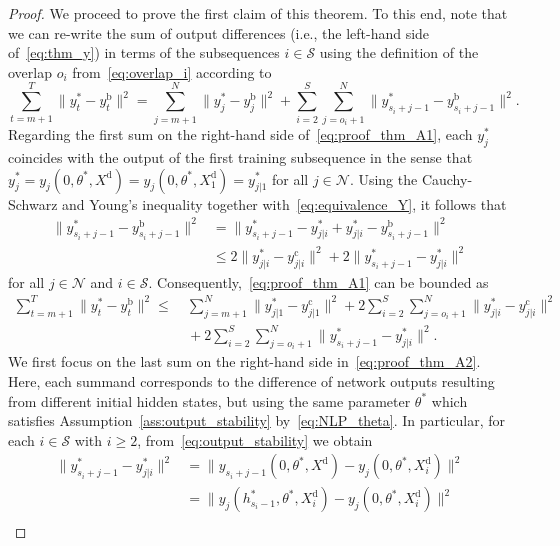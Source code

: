 \documentclass{article} %
\begin{document}
\begin{proof}
	We proceed to prove the first claim of this theorem. To this end, note that	we can re-write the sum of output differences (i.e., the left-hand side of~\eqref{eq:thm_y}) in terms of the subsequences $i\in\mathcal{S}$ using the definition of the overlap $o_i$ from~\eqref{eq:overlap_i} according to
	\begin{equation}
		\sum_{t=m+1}^{T}\|y^*_t-y_t^\mathrm{b}\|^2
		= \sum_{j=m+1}^{N}\|y^*_j-y_j^\mathrm{b}\|^2
		+ \sum_{i=2}^{S}\sum_{j=o_i+1}^{N}\|y^*_{s_i+j-1}-y^\mathrm{b}_{s_i+j-1}\|^2.\label{eq:proof_thm_A1}
	\end{equation}
	Regarding the first sum on the right-hand side of~\eqref{eq:proof_thm_A1}, each $y^*_j$ coincides with the output of the first training subsequence in the sense that $y^*_j = y_j(0,\theta^*,X^\mathrm{d}) = y_j(0,\theta^*,X^\mathrm{d}_1) = y^*_{j|1}$ for all $j\in \mathcal{N}$.
	Using the Cauchy-Schwarz and Young's inequality together with~\eqref{eq:equivalence_Y}, it follows that
	\begin{align*}
		\|y^*_{s_i+j-1}-y^\mathrm{b}_{s_i+j-1}\|^2
		&= \|y_{s_i+j-1}^*-y_{j|i}^*+y_{j|i}^*-y^\mathrm{b}_{s_i+j-1}\|^2\\
		&\leq 2\|y_{j|i}^*-y_{j|i}^\mathrm{c}\|^2 + 2\|y_{s_i+j-1}^*-y_{j|i}^*\|^2
	\end{align*}
	for all $j\in\mathcal{N}$ and $i\in\mathcal{S}$.
	Consequently,~\eqref{eq:proof_thm_A1} can be bounded as
	\begin{align}
		\sum_{t=m+1}^{T}\|y^*_t-y_t^\mathrm{b}\|^2
		\leq&\ 
		\sum_{j=m+1}^{N}\|y^*_{j|1}-y_{j|1}^\mathrm{c}\|^2 +
		2\sum_{i=2}^{S}\sum_{j=o_i+1}^{N}\|y_{j|i}^*-y^\mathrm{c}_{j|i}\|^2\nonumber \\
		&\ +
		2\sum_{i=2}^{S}\sum_{j=o_i+1}^{N}\|y^*_{s_i+j-1}-y_{j|i}^*\|^2. \label{eq:proof_thm_A2}
	\end{align}
	We first focus on the last sum on the right-hand side in~\eqref{eq:proof_thm_A2}.
	Here, each summand corresponds to the difference of network outputs resulting from different initial hidden states, but using the same parameter $\theta^*$ which satisfies Assumption~\ref{ass:output_stability} by~\eqref{eq:NLP_theta}.
	In particular, for each $i\in\mathcal{S}$ with $i\geq2$, from~\eqref{eq:output_stability} we obtain
	\begin{align*}
		\|y^*_{s_i+j-1}-y_{j|i}^*\|^2 
		&= \|y_{s_i+j-1}(0,\theta^*,X^\mathrm{d})-y_j(0,\theta^*,X_i^\mathrm{d})\|^2\\
		&= \|y_{j}(h_{s_i-1}^*,\theta^*,X_i^\mathrm{d})-y_j(0,\theta^*,X_i^\mathrm{d})\|^2\\

\end{align*}
\end{proof}
\end{document}
